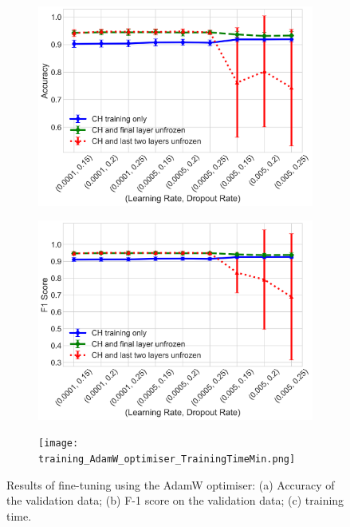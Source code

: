 \documentclass[a4paper,12pt]{article}
\newcommand{\figwidthh}{0.48\textwidth}
\begin{document}
\begin{figure}[tbp] 
	\begin{center}
		\begin{subfigure}[b]{\figwidthh}
			\caption{} 
			\includegraphics[width=\textwidth]{AdamW_optimiser_accuracy.png}
		\end{subfigure}
        \hfill
		\begin{subfigure}[b]{\figwidthh}
			\caption{}
			\includegraphics[width=\textwidth]{AdamW_optimiser_f1_score.png}
		\end{subfigure}
        \hfill
		\begin{subfigure}[b]{\figwidthh}
			\caption{}
			\texttt{[image: training\_AdamW\_optimiser\_TrainingTimeMin.png]}
		\end{subfigure}
	\end{center}
	\caption{Results of fine-tuning using the AdamW optimiser: (a) Accuracy of the validation data; (b) F-1 score on the validation data; (c) training time. 
	} 
	\label{fig:res_training_adamW}
\end{figure}
\end{document}
